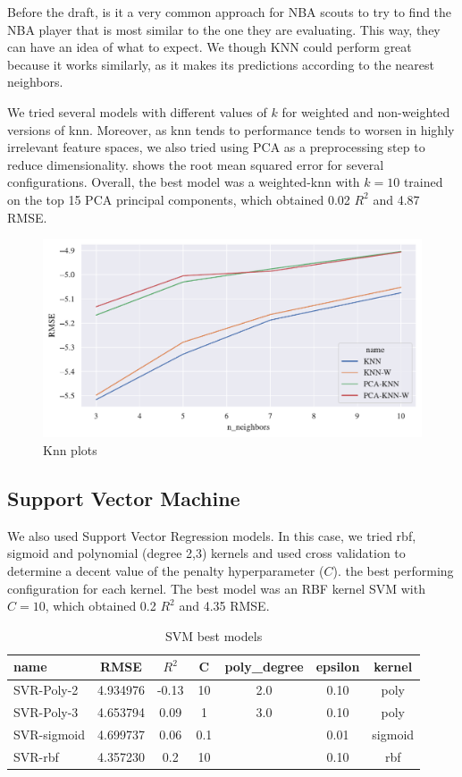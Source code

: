 Before the draft, is it a very common approach for NBA scouts to try to find the NBA player that is most similar to the one they are evaluating. This way, they can have an idea of what to expect. We though KNN could perform great because it works similarly, as it makes its predictions according to the nearest neighbors.

We tried several models with different values of $k$ for weighted and non-weighted versions of knn. Moreover, as knn tends to performance tends to worsen in highly irrelevant feature spaces, we also tried using PCA as a preprocessing step to reduce dimensionality.  shows the root mean squared error for several configurations. Overall, the best model was a weighted-knn with $k=10$ trained on the top 15 PCA principal components, which obtained 0.02 $R^2$ and 4.87 RMSE.

\begin{figure}[H]
    \centering
    \includegraphics[width=0.8\linewidth]{figures/knn.pdf}
    \caption{Knn plots}
    \label{fig:knn}
\end{figure}

\subsection{Support Vector Machine}%
\label{ssub:support-vector-machine}

We also used Support Vector Regression models. In this case, we tried rbf, sigmoid and polynomial (degree 2,3) kernels and used cross validation to determine a decent value of the penalty hyperparameter ($C$).  the best performing configuration for each kernel. The best model was an RBF kernel SVM with $C=10$, which obtained 0.2 $R^2$ and 4.35 RMSE.

\begin{table}[H]
    \centering
    \begin{tabular}{lcccccc}
    \toprule
    name & RMSE & $R^2$ & C &  poly\_degree &  epsilon & kernel \\
    \midrule
    SVR-Poly-2 & 4.934976 & -0.13 & 10  & 2.0 &  0.10 & poly \\
    SVR-Poly-3 & 4.653794 & 0.09 & 1 & 3.0 & 0.10 & poly \\
    SVR-sigmoid & 4.699737 & 0.06 & 0.1 &     & 0.01 & sigmoid \\
    SVR-rbf & 4.357230 & 0.2 & 10 &     & 0.10 &  rbf \\
    \bottomrule
    \end{tabular}
    \caption{SVM best models}
    \label{ml:svm}
\end{table}

